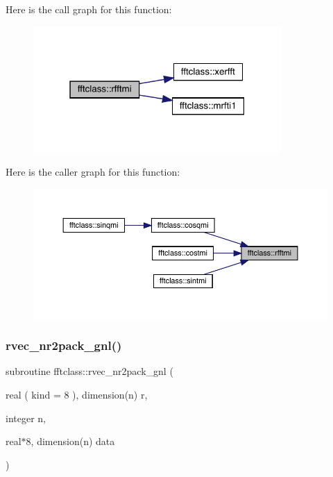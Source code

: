 Here is the call graph for this function\+:\nopagebreak
\begin{figure}[H]
\begin{center}
\leavevmode
\includegraphics[width=268pt]{namespacefftclass_a6a543283f910322f94293d719f923881_cgraph}
\end{center}
\end{figure}
Here is the caller graph for this function\+:\nopagebreak
\begin{figure}[H]
\begin{center}
\leavevmode
\includegraphics[width=350pt]{namespacefftclass_a6a543283f910322f94293d719f923881_icgraph}
\end{center}
\end{figure}
\mbox{\label{namespacefftclass_a2c47e8aa546c8ea9f5f23219be52d57e}} 
\subsubsection{\texorpdfstring{rvec\_nr2pack\_gnl()}{rvec\_nr2pack\_gnl()}}
{\footnotesize\ttfamily subroutine fftclass\+::rvec\+\_\+nr2pack\+\_\+gnl (\begin{DoxyParamCaption}\item[{real ( kind = 8 ), dimension(n)}]{r,  }\item[{integer}]{n,  }\item[{real$\ast$8, dimension(n)}]{data }\end{DoxyParamCaption})}



